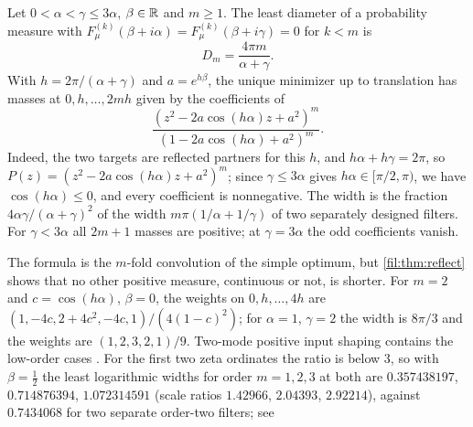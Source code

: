 \begin{example}\label{fil:cor:pair}
Let $0<\alpha<\gamma\le3\alpha$, $\beta\in\mathbb{R}$ and $m\ge1$. The least diameter of a probability measure
with $F_\mu^{(k)}(\beta+i\alpha)=F_\mu^{(k)}(\beta+i\gamma)=0$ for $k<m$ is
\[
 D_m=\frac{4\pi m}{\alpha+\gamma}.
\]
With $h=2\pi/(\alpha+\gamma)$ and $a=e^{h\beta}$, the unique minimizer up to translation has masses at
$0,h,\dots,2mh$ given by the coefficients of
\[
 \frac{(z^2-2a\cos(h\alpha)z+a^2)^m}{(1-2a\cos(h\alpha)+a^2)^m}.
\]
Indeed, the two targets are reflected partners for this $h$, and $h\alpha+h\gamma=2\pi$, so
$P(z)=(z^2-2a\cos(h\alpha)z+a^2)^m$; since $\gamma\le3\alpha$ gives $h\alpha\in[\pi/2,\pi)$, we have
$\cos(h\alpha)\le0$, and every coefficient is nonnegative. The width is the fraction
$4\alpha\gamma/(\alpha+\gamma)^2$ of the width $m\pi(1/\alpha+1/\gamma)$ of two separately designed filters.
For $\gamma<3\alpha$ all $2m+1$ masses are positive; at $\gamma=3\alpha$ the odd coefficients vanish.
\end{example}

The formula is the $m$-fold convolution of the simple optimum, but \cref{fil:thm:reflect} shows that no
other positive measure, continuous or not, is shorter. For $m=2$ and $c=\cos(h\alpha)$, $\beta=0$, the weights
on $0,h,\dots,4h$ are $(1,-4c,2+4c^2,-4c,1)/(4(1-c)^2)$; for $\alpha=1$, $\gamma=2$ the width is $8\pi/3$
and the weights are $(1,2,3,2,1)/9$. Two-mode positive input shaping contains the low-order cases
\cite{CrainSinghoseSeering1996Derivation,SinghoseCrainSeering1997Convolved,LauPao2003Input,PaoSinghose1998Robust,Singhose1997Command}.
For the first two zeta ordinates the ratio is below $3$, so with $\beta=\tfrac12$ the least
logarithmic widths for order $m=1,2,3$ at both are $0.357438197$, $0.714876394$, $1.072314591$
(scale ratios $1.42966$, $2.04393$, $2.92214$), against $0.7434068$ for two separate order-two
filters; see
\begin{center}
\\
\end{center}

